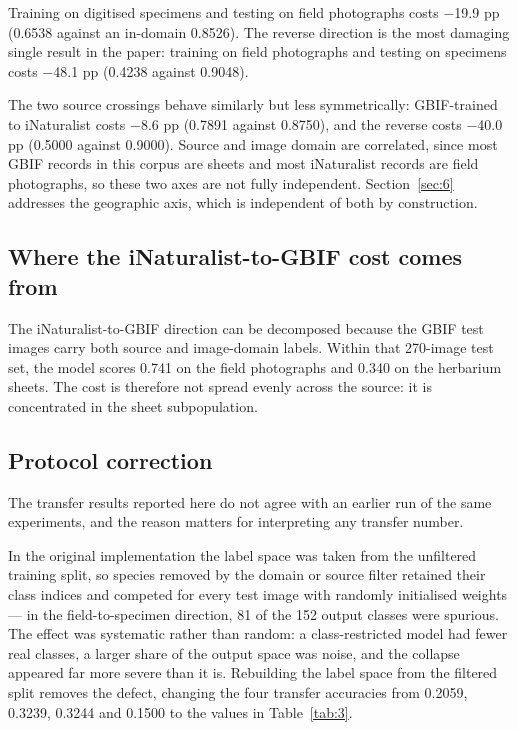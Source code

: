 \documentclass[preprint,12pt,authoryear]{elsarticle}
\begin{document}
Training on digitised specimens and testing on field photographs costs $-$19.9 pp (0.6538 against an in-domain 0.8526). The reverse direction is the most damaging single result in the paper: training on field photographs and testing on specimens costs $-$48.1 pp (0.4238 against 0.9048).

The two source crossings behave similarly but less symmetrically: GBIF-trained to iNaturalist costs $-$8.6 pp (0.7891 against 0.8750), and the reverse costs $-$40.0 pp (0.5000 against 0.9000). Source and image domain are correlated, since most GBIF records in this corpus are sheets and most iNaturalist records are field photographs, so these two axes are not fully independent. Section~\ref{sec:6} addresses the geographic axis, which is independent of both by construction.

\setcounter{section}{5}

\setcounter{subsection}{2}

\subsection{Where the iNaturalist-to-GBIF cost comes from}\label{sec:5.3}

The iNaturalist-to-GBIF direction can be decomposed because the GBIF test images carry both source and image-domain labels. Within that 270-image test set, the model scores 0.741 on the field photographs and 0.340 on the herbarium sheets. The cost is therefore not spread evenly across the source: it is concentrated in the sheet subpopulation.

\setcounter{section}{5}

\setcounter{subsection}{3}

\subsection{Protocol correction}\label{sec:5.4}

The transfer results reported here do not agree with an earlier run of the same experiments, and the reason matters for interpreting any transfer number.

In the original implementation the label space was taken from the unfiltered training split, so species removed by the domain or source filter retained their class indices and competed for every test image with randomly initialised weights --- in the field-to-specimen direction, 81 of the 152 output classes were spurious. The effect was systematic rather than random: a class-restricted model had fewer real classes, a larger share of the output space was noise, and the collapse appeared far more severe than it is. Rebuilding the label space from the filtered split removes the defect, changing the four transfer accuracies from 0.2059, 0.3239, 0.3244 and 0.1500 to the values in Table~\ref{tab:3}.
\end{document}
